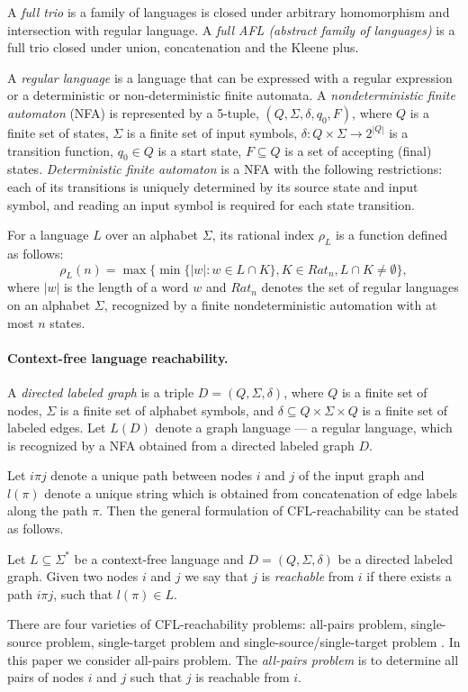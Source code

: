 A \textit{full trio} is a family of languages is closed under arbitrary homomorphism and intersection with regular language. A \textit{full AFL (abstract family of languages)} is a full trio closed under union, concatenation and the Kleene plus. 


A \textit{regular language} is a language that can be expressed with a regular expression or a deterministic or non-deterministic finite automata.
A \textit{nondeterministic finite automaton} (NFA) is represented by a 5-tuple, $(Q,\Sigma ,\delta ,q_{0},F)$, where $Q$ is a finite set of states, $\Sigma$ is a finite set of input symbols, $\delta:Q\times \Sigma \rightarrow 2^{|Q|}$ is a transition function, $q_0 \in Q$ is a start state, $F \subseteq Q$ is a set of accepting (final) states. \textit{Deterministic finite automaton} is a NFA with the following restrictions: each of its transitions is uniquely determined by its source state and input symbol, and reading an input symbol is required for each state transition.


 For a language $L$ over an alphabet $\Sigma$, its rational index $\rho_L$ is a function defined as follows:
$$\rho_L(n) = \max\{\min\{|w|:w \in L \cap K\}, K \in {Rat}_n, L \cap K \neq \emptyset\},$$ where $|w|$ is the length of a word $w$ and ${Rat}_n$ denotes the set of regular languages on an alphabet $\Sigma$, recognized by a finite nondeterministic automation with at most $n$ states.
\paragraph{Context-free language reachability.} 
A \textit{directed labeled graph} is a triple $D = (Q, \Sigma, \delta)$, where $Q$ is a finite set of nodes, $\Sigma$ is a finite set of alphabet symbols,
and $\delta \subseteq Q \times \Sigma \times Q$ is a finite set of labeled edges. Let $L(D)$ denote a graph language --- a regular language, which is recognized by a NFA obtained from a directed labeled graph $D$.


Let $i\pi j$ denote a unique path between nodes $i$ and $j$ of the input graph and $l(\pi)$ denote a unique string which is obtained from concatenation of edge labels along the path $\pi$. Then the general formulation of CFL-reachability can be stated as follows.
\begin{definition}
Let $L \subseteq \Sigma^*$ be a context-free language and $D = (Q, \Sigma, \delta)$ be a directed labeled graph. Given two nodes $i$ and $j$ we say that $j$ is \textit{reachable} from $i$ if there exists a path $i \pi j$, such that $l(\pi) \in L$. 
\end{definition}
There are four varieties of CFL-reachability problems: all-pairs problem, single-source problem, single-target problem and single-source/single-target problem \cite{RepsBasic}. In this paper we consider all-pairs problem. The \textit{all-pairs problem} is to determine all pairs of nodes $i$ and $j$ such that $j$ is reachable from $i$. 

